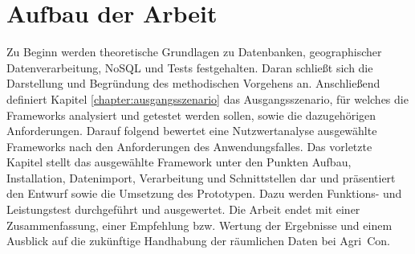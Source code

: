 \section{Aufbau der Arbeit}


Zu Beginn werden theoretische Grundlagen zu Datenbanken, geographischer Datenverarbeitung, NoSQL und Tests festgehalten.
Daran schließt sich die Darstellung und Begründung des methodischen Vorgehens an.
Anschließend definiert Kapitel \ref{chapter:ausgangsszenario} das Ausgangsszenario, für welches die Frameworks analysiert und getestet werden sollen, sowie die dazugehörigen Anforderungen.
Darauf folgend bewertet eine Nutzwertanalyse ausgewählte Frameworks nach den Anforderungen des Anwendungsfalles.
Das vorletzte Kapitel stellt das ausgewählte Framework unter den Punkten Aufbau, Installation, Datenimport, Verarbeitung und Schnittstellen dar und präsentiert den Entwurf sowie die Umsetzung des Prototypen.
Dazu werden Funktions- und Leistungstest durchgeführt und ausgewertet.
Die Arbeit endet mit einer Zusammenfassung, einer Empfehlung bzw. Wertung der Ergebnisse und einem Ausblick auf die zukünftige Handhabung der räumlichen Daten bei Agri~Con.